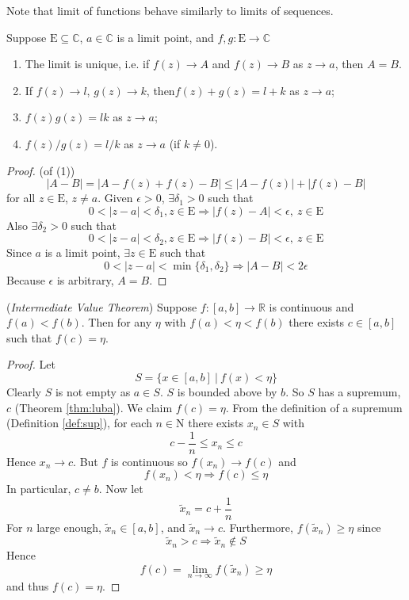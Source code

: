\documentclass[10pt, a4paper, twoside]{report}
\begin{document}
Note that limit of functions behave similarly to limits of sequences.
\begin{lemma}
    Suppose \(\mathrm{E}\subseteq\mathbb{C}\), \(a\in\mathbb{C}\) is a limit point, and \(f,g:\mathrm{E}\to\mathbb{C}\)
    \begin{enumerate}
        \item The limit is unique, i.e. if \(f(z)\to A\) and \(f(z)\to B\) as \(z\to a\), then \(A=B\).
        \item If \(f(z)\to l\), \(g(z)\to k\), then\(f(z)+g(z)=l+k\) \space as \(z\to a\);
        \item \(f(z)g(z)=lk\) \space as \(z\to a\);
        \item \(f(z)/g(z)=l/k\) \space as \(z\to a\) (if \(k\neq 0\)).
    \end{enumerate}
    \label{lemma:fund_limit}
\end{lemma}
\begin{proof}
    (of (1))
    \[|A-B|=|A-f(z)+f(z)-B|\leq|A-f(z)|+|f(z)-B|\]
    for all \(z\in\mathrm{E}\), \(z\neq a\). Given \(\epsilon>0\), \(\exists\delta_1>0\) such that
    \[0<|z-a|<\delta_1,z\in\mathrm{E}\Rightarrow |f(z)-A|<\epsilon,\:z\in\mathrm{E}\]
    Also \(\exists\delta_2>0\) such that 
    \[0<|z-a|<\delta_2,z\in\mathrm{E}\Rightarrow |f(z)-B|<\epsilon,\:z\in\mathrm{E}\]
    Since \(a\) is a limit point, \(\exists z\in\mathrm{E}\) such that 
    \[0<|z-a|<\min\{\delta_1,\delta_2\}\Rightarrow|A-B|<2\epsilon\]
    Because \(\epsilon\) is arbitrary, \(A=B\).
\end{proof}
\begin{theorem}
    (\emph{Intermediate Value Theorem}) Suppose \(f:[a,b]\to\mathbb{R}\) is continuous and \(f(a)<f(b)\). Then for any \(\eta\) with \(f(a)<\eta<f(b)\) there exists \(c\in[a,b]\) such that \(f(c)=\eta\).
    \label{thm:ivt}
\end{theorem}
\begin{proof}
    Let 
    \[S=\{x\in[a,b]\:|\:f(x)<\eta\}\]
    Clearly \(S\) is not empty as \(a\in S\). \(S\) is bounded above by \(b\). So \(S\) has a supremum, \(c\) (Theorem \ref{thm:luba}). We claim \(f(c)=\eta\). From the definition of a supremum (Definition \ref{def:sup}), for each \(n\in\mathrm{N}\) there exists \(x_n\in S\) with 
    \[c-\frac 1n\leq x_n\leq c\]
    Hence \(x_n\to c\). But \(f\) is continuous so \(f(x_n)\to f(c)\) and 
    \[f(x_n)<\eta\Rightarrow f(c)\leq\eta\]
    In particular, \(c\neq b\). Now let
    \[\tilde{x}_n=c+\frac 1n\]
    For \(n\) large enough, \(\tilde{x}_n\in[a,b]\), and \(\tilde{x}_n\to c\). Furthermore, \(f(\tilde{x}_n)\geq\eta\) since \[\tilde{x}_n>c\Rightarrow\tilde{x}_n\notin S\]
    Hence 
    \[f(c)=\lim_{n\to\infty}f(\tilde{x}_n)\geq\eta\]
    and thus \(f(c)=\eta\).
\end{proof}
\end{document}
